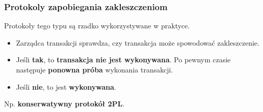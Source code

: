 \documentclass[a4paper]{article}
\begin{document}
\subsubsection{Protokoly zapobiegania zakleszczeniom}
Protokoły	tego	typu	są	rzadko	wykorzystywane	w	praktyce.
\begin{itemize}
    \item Zarządca	transakcji	sprawdza, czy transakcja	 może spowodować zakleszczenie.
    \item Jeśli \textbf{tak}, to	 \textbf{transakcja	 nie	 jest wykonywana}.	Po	pewnym	czasie	następuje	\textbf{ponowna próba}	wykonania	transakcji.
    \item Jeśli \textbf{nie}, to jest \textbf{wykonywana}.
\end{itemize}
Np. \textbf{konserwatywny	protokół 2PL}.
\end{document}
